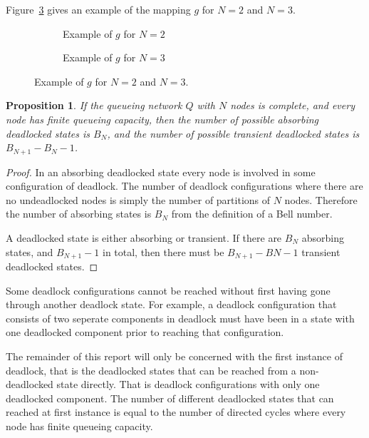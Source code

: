\documentclass{article}
\newtheorem{proposition}{Proposition}
\begin{document}
Figure~\ref{fig:exampleofmapping} gives an example of the mapping $g$ for $N=2$ and $N=3$.

\begin{figure}[!htbp]
\begin{subfigure}[b]{\textwidth}
  \begin{center}
    
  \end{center}
  \caption{Example of $g$ for $N=2$}
  \label{fig:2Nmapping}
\end{subfigure}\newline
\newline
\begin{subfigure}[b]{\textwidth}
  
  \caption{Example of $g$ for $N=3$}
  \label{fig:3Nmapping}
\end{subfigure}
\caption{Example of $g$ for $N=2$ and $N=3$.}
\label{fig:exampleofmapping}
\end{figure}

\begin{proposition}
  If the queueing network $Q$ with $N$ nodes is complete, and every node has finite queueing capacity, then the number of possible absorbing deadlocked states is $B_N$, and the number of possible transient deadlocked states is $B_{N+1}-B_N-1$.
\end{proposition}

\begin{proof}
In an absorbing deadlocked state every node is involved in some configuration of deadlock.
The number of deadlock configurations where there are no undeadlocked nodes is simply the number of partitions of $N$ nodes.
Therefore the number of absorbing states is $B_N$ from the definition of a Bell number.

A deadlocked state is either absorbing or transient.
If there are $B_N$ absorbing states, and $B_{N+1}-1$ in total, then there must be $B_{N+1}-B{N}-1$ transient deadlocked states.
\end{proof}

Some deadlock configurations cannot be reached without first having gone through another deadlock state.
For example, a deadlock configuration that consists of two seperate components in deadlock must have been in a state with one deadlocked component prior to reaching that configuration.

The remainder of this report will only be concerned with the first instance of deadlock, that is the deadlocked states that can be reached from a non-deadlocked state directly.
That is deadlock configurations with only one deadlocked component.
The number of different deadlocked states that can reached at first instance is equal to the number of directed cycles where every node has finite queueing capacity.
\end{document}
